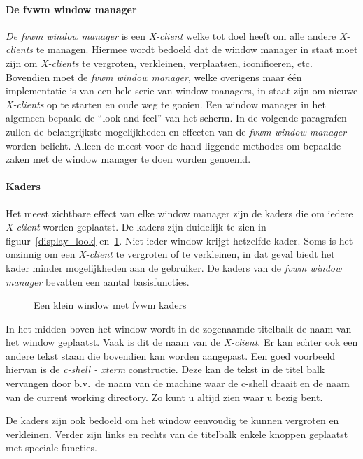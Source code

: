\paragraph{De fvwm window manager}
\label{De fvwm window manager}
{\em De fvwm window manager} is een {\em X-client} welke tot doel
heeft om alle andere {\em X-clients} te managen.  Hiermee wordt
bedoeld dat de window manager in staat moet zijn om {\em X-clients} te
vergroten, verkleinen, verplaatsen, iconificeren, etc.
Bovendien moet de {\em fvwm window manager}, welke overigens maar \'e\'en
implementatie is van een hele serie van window managers, in staat zijn
om nieuwe {\em X-clients} op te starten en oude weg te gooien. Een
window manager in het algemeen bepaald de ``look and feel'' van het
scherm.  In de volgende paragrafen zullen de belangrijkste
mogelijkheden en effecten van de {\em fvwm window manager} worden
belicht. Alleen de meest voor de hand liggende methodes om
bepaalde zaken met de window manager te doen worden genoemd.

\paragraph{Kaders}
Het meest zichtbare effect van elke window manager zijn de
kaders die om iedere {\em X-client} worden geplaatst.
De kaders zijn duidelijk te zien  in figuur~\ref{display_look} en~\ref{kaders}.
Niet ieder window krijgt hetzelfde kader. Soms is het onzinnig om
een {\em X-client} te vergroten of te verkleinen, in dat geval
biedt het kader minder mogelijkheden aan de gebruiker.
De kaders van de {\em fvwm window manager} bevatten  een aantal basisfuncties.
\begin{figure}[bth]
\centerline{}
\caption{Een klein window met fvwm kaders
\label{kaders}}
\end{figure}

In het midden boven het window wordt in de zogenaamde titelbalk
de naam van het window geplaatst.
Vaak is dit de naam van de {\em X-client}. Er kan
echter ook een andere tekst staan die bovendien kan worden aangepast.
Een goed voorbeeld hiervan is de {\em c-shell - xterm}
constructie. Deze kan de tekst in de titel
balk vervangen door b.v.\ de naam van de machine waar de c-shell draait en
de naam van de current working directory. Zo kunt u altijd zien waar
u bezig bent.

De kaders zijn ook bedoeld om het window eenvoudig te kunnen vergroten en
verkleinen.
Verder zijn links en rechts
van de titelbalk enkele knoppen geplaatst met speciale functies.
